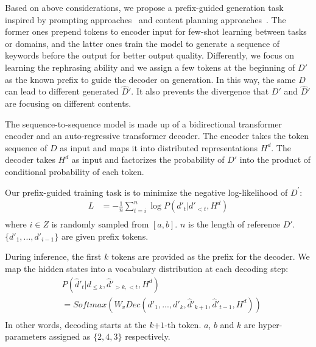 Based on above considerations, we propose a prefix-guided generation task inspired by prompting approaches~\cite{raffel2020exploring,brown2020language} and content planning approaches~\cite{narayan2021planning,wu2021controllable}.
The former ones prepend tokens to encoder input for few-shot learning between tasks or domains, and the latter ones train the model to generate a sequence of keywords before the output for better output quality.
Differently, we focus on learning the rephrasing ability and we assign a few tokens at the beginning of $D'$ as the known prefix to guide the decoder on generation. In this way, the same $D$ can lead to different generated $\hat{D}'$. It also prevents the divergence that $D'$ and $\hat{D}'$ are focusing on different contents.%

The sequence-to-sequence model is made up of a bidirectional transformer encoder and an auto-regressive transformer decoder. The encoder takes the token sequence of $D$ as input and maps it into distributed representations $H^d$. The decoder takes $H^d$ as input and factorizes the probability of $D'$ into the product of conditional probability of each token. 

Our prefix-guided training task is to minimize the negative log-likelihood of $D^\prime$:
\begin{equation}
\begin{aligned}
L &= -\frac{1}{n}\sum_{t=i}^{n}\log P(d'_t|d'_{<t},H^d) \\
\end{aligned}
\end{equation}
where $i\in Z$ is randomly sampled from $[a,b]$. $n$ is the length of reference $D'$. $\{d'_1, ..., d'_{i-1}\}$ are given prefix tokens. 

During inference, the first $k$ tokens are provided as the prefix for the decoder. We map the hidden states into a vocabulary distribution at each decoding step:
\begin{equation}
	\begin{aligned}
 &P(\hat{d}'_t|d_{\leq k}, \hat{d}'_{>k,<t},H^d) \\
 &= Softmax(W_vDec(d'_1, ..., d'_k, \hat{d}'_{k+1}, \hat{d}'_{t-1}, H^d))\\
 \end{aligned}
\end{equation}
In other words, decoding starts at the $k$+$1$-th token.
$a$, $b$ and $k$ are hyper-parameters assigned as $\{2,4,3\}$ respectively.

